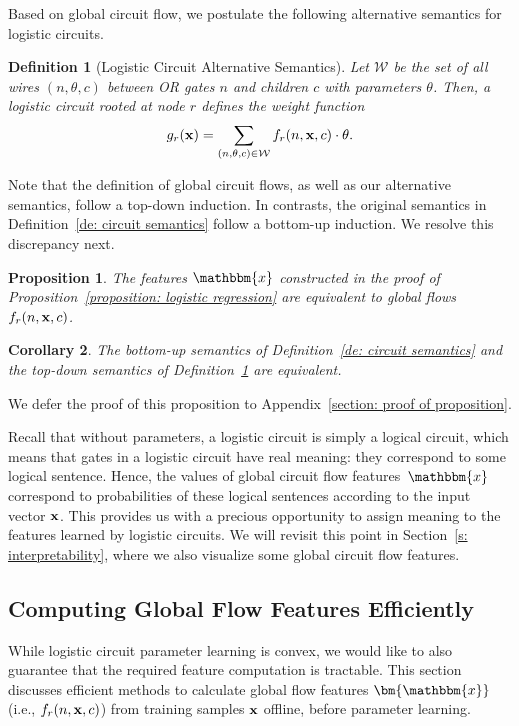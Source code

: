 \documentclass[letterpaper]{article} %
\newtheorem{corollary}{Corollary}
\newtheorem{proposition}[corollary]{Proposition}
\newtheorem{definition}{Definition}
\newcommand{\coe}{g}
\newcommand{\sample}{{\bf x}}
\begin{document}
Based on global circuit flow, we postulate the following alternative semantics for logistic circuits.
\begin{definition}[Logistic Circuit Alternative Semantics]
\label{definition: circuit semantic using global flow}
Let $\mathcal{W}$ be the set of all wires $(n,
\theta,c)$ between OR gates $n$ and children $c$ with parameters $\theta$.
Then, a logistic circuit rooted at node $r$ defines the weight function
$$
	\coe_r(\sample) = \sum_{(n,\theta,c) \in \mathcal{W}} f_r(n,\sample,c) \cdot \theta.
$$
\end{definition}
 
Note that the definition of global circuit flows, as well as our alternative semantics, follow a top-down induction. 
In contrasts, the original semantics in Definition~\ref{de: circuit semantics} follow a bottom-up induction.
We resolve this discrepancy next.
\begin{proposition}
\label{proposition: features}
The features $\mathbbm{x}$ constructed in the proof of Proposition~\ref{proposition: logistic regression} are equivalent to global flows $f_r(n,\sample,c)$.
\end{proposition}
\begin{corollary}
The bottom-up semantics of Definition~\ref{de: circuit semantics} and the top-down semantics of Definition~\ref{definition: circuit semantic using global flow} are equivalent.
\end{corollary}
\noindent We defer the proof of this proposition to Appendix~\ref{section: proof of proposition}.

Recall that without parameters, a logistic circuit is simply a logical circuit, which means that gates in a logistic circuit have real meaning: they correspond to some logical sentence. Hence, the values of global circuit flow features~$\mathbbm{x}$ correspond to probabilities of these logical sentences according to the input vector $\sample$. This provides us with a precious opportunity to assign meaning to the features learned by logistic circuits. We will revisit this point in Section~\ref{s: interpretability}, where we also visualize some global circuit flow features.

\subsection{Computing Global Flow Features Efficiently}
\label{section: computing flows}
While logistic circuit parameter learning is convex, we would like to also guarantee that the required feature computation is tractable. This section discusses efficient methods to calculate global flow features $\bm{\mathbbm{x}}$ (i.e., $f_r(n, \sample, c)$) from training samples $\bf x$ offline, before parameter learning. 
 
\end{document}
